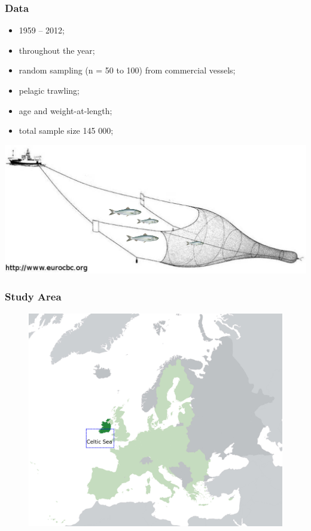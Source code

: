 \documentclass{beamer}
\begin{document}
\begin{frame}
\frametitle{Data}
    \begin{itemize}
        \item 1959 -- 2012;
        \item throughout the year;
        \item random sampling (n = 50 to 100) from commercial vessels;
        \item pelagic trawling;
        \item age and weight-at-length;
        \item total sample size 145 000;
    \end{itemize}
\begin{center}
{\includegraphics[scale=0.4]{../fig/trawl} }
\end{center}
        
\end{frame}


\begin{frame}
\frametitle{Study Area}
\begin{figure}
\includegraphics[width=1.1\linewidth,height=0.85\textheight,keepaspectratio]{../fig/EU-Ireland} 
\end{figure}
\end{frame}
\end{document}

